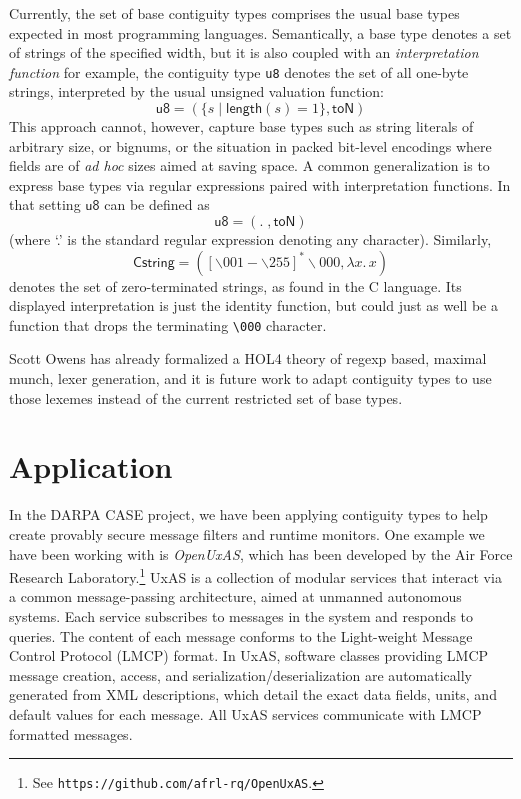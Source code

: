\documentclass[a4paper,UKenglish,cleveref, autoref, thm-restate]{lipics-v2021}
\newcommand{\konst}[1]{\ensuremath{\mathsf{#1}}}
\newcommand{\set}[1]{\ensuremath{\{ {#1} \}}}
\begin{document}
Currently, the set of base contiguity types comprises the usual base
types expected in most programming languages. Semantically, a base
type denotes a set of strings of the specified width, but it is also
coupled with an \emph{interpretation function} for example, the
contiguity type \verb+u8+ denotes the set of all one-byte strings,
interpreted by the usual unsigned valuation function:
%
\[ \konst{u8} = (\set{s \mid \konst{length}(s) = 1}, \konst{toN} )
\]
%
This approach cannot, however, capture base types such as string
literals of arbitrary size, or bignums, or the situation in packed
bit-level encodings where fields are of \emph{ad hoc} sizes aimed at
saving space. A common generalization is to express base types via
regular expressions paired with interpretation functions. In that
setting \konst{u8} can be defined as
%
\[ \konst{u8} = ( . \; , \konst{toN})
\]
%
(where `.' is the standard regular expression denoting any character). Similarly,
%
\[ \konst{Cstring} = ([\backslash 001-\backslash 255]^{*}\backslash 000, \lambda x.\,x )
\]
%
denotes the set of zero-terminated strings, as found in the C
language. Its displayed interpretation is just the identity function,
but could just as well be a function that drops the terminating
\verb+\000+ character.

Scott Owens has already formalized a HOL4 theory of regexp based,
maximal munch, lexer generation, and it is future work to adapt
contiguity types to use those lexemes instead of the current
restricted set of base types.

\section{Application}\label{application}

In the DARPA CASE project, we have been applying contiguity types to
help create provably secure message filters and runtime monitors. One
example we have been working with is \emph{OpenUxAS}, which has been
developed by the Air Force Research Laboratory.\footnote{See
  \texttt{https://github.com/afrl-rq/OpenUxAS}.}  UxAS is a collection
of modular services that interact via a common message-passing
architecture, aimed at unmanned autonomous systems.  Each service
subscribes to messages in the system and responds to queries. The
content of each message conforms to the Light-weight Message Control
Protocol (LMCP) format. In UxAS, software classes providing LMCP
message creation, access, and serialization/deserialization are
automatically generated from XML descriptions, which detail the exact
data fields, units, and default values for each message. All UxAS
services communicate with LMCP formatted messages.
\end{document}
